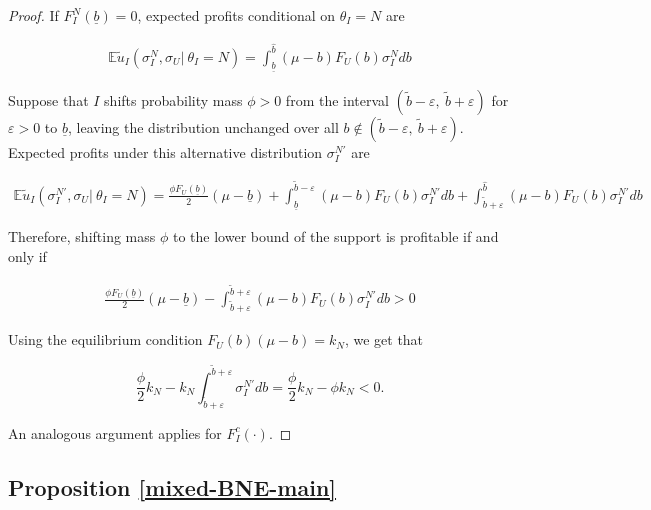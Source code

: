 \documentclass[11pt]{article}
\theoremstyle{plain}
\theoremstyle{definition}
\theoremstyle{plain}
\theoremstyle{plain}
\theoremstyle{plain}
\theoremstyle{plain}
\numberwithin{equation}{section}
\begin{document}
\begin{proof}
    If $F_I^N(\underline{b}) = 0$, expected profits conditional on $\theta_I = N$ are
    
\begin{align*}
    \mathbb{E}\tilde{u}_I (\sigma_I^N,\sigma_U |\ \theta_I = N) = \int_{\underline{b}}^{\hat{b}}(\mu-b)F_U(b)\sigma_I^N db
\end{align*}
\vspace{-0.2mm}

\noindent Suppose that $I$ shifts probability mass $\phi>0$ from the interval $(\tilde{b}-\varepsilon, \ \tilde{b}+\varepsilon)$ for $\varepsilon>0$ to $\underline{b}$, leaving the distribution unchanged over all $b \notin (\tilde{b}-\varepsilon, \ \tilde{b}+\varepsilon)$. Expected profits under this alternative distribution $\sigma_I^{N'}$ are

\begin{align*}
    \mathbb{E}\tilde{u}_I (\sigma_I^{N'},\sigma_U |\ \theta_I = N) = \frac{\phi F_U(\underline{b})}{2}(\mu-\underline{b}) +\int_{\underline{b}}^{\tilde{b}-\varepsilon}(\mu-b)F_U(b)\sigma_I^{N'} db+\int_{\tilde{b}+\varepsilon}^{\hat{b}}(\mu-b)F_U(b)\sigma_I^{N'} db
\end{align*}
\vspace{-0.2mm}

\noindent Therefore, shifting mass $\phi$ to the lower bound of the support is profitable if and only if

\begin{align*}
    \frac{\phi F_U(\underline{b})}{2}(\mu-\underline{b}) - \int_{\tilde{b}+\varepsilon}^{\tilde{b}+\varepsilon}(\mu-b)F_U(b)\sigma_I^{N'} db > 0
\end{align*}
\vspace{-0.2mm}

\noindent Using the equilibrium condition $F_U(b)(\mu-b) = k_N$, we get that

\begin{equation*}
    \frac{\phi}{2}k_N - k_N \int_{\tilde{b}+\varepsilon}^{\tilde{b}+\varepsilon}\sigma_I^{N'} db = \frac{\phi}{2}k_N - \phi k_N < 0.
\end{equation*}
\vspace{-0.2mm}

\noindent An analogous argument applies for $F_I^c(\cdot)$. 
\end{proof}

\subsection*{Proposition \ref{mixed-BNE-main}}
\end{document}
